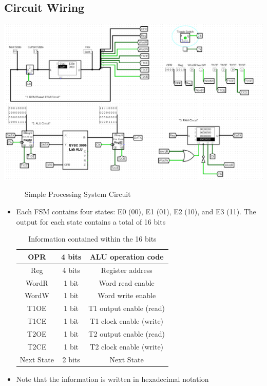 \documentclass{article}
\begin{document}
	\subsection{Circuit Wiring}
	\begin{center}
	\includegraphics[width=\linewidth]{simple_processing_system_circuit.png}
	\end{center}

	\begin{figure}[h]
		\centering
		\caption {Simple Processing System Circuit}
	\end{figure}	

	\begin{itemize}
		\item Each FSM contains four states: E0 (00), E1 (01), E2 (10), and E3 (11). The output for each state contains a total of 16 bits
		
		\begin{table}[h]
			\centering
			\caption{Information contained within the 16 bits}
			\vspace{0.2cm}
			\begin{tabular}{|c|c|c|}
				\hline
				OPR & 4 bits & ALU operation code\\
				\hline
				Reg & 4 bits & Register address\\
				\hline
				WordR & 1 bit & Word read enable\\
				\hline
				WordW & 1 bit & Word write enable\\
				\hline
				T1OE & 1 bit & T1 output enable (read)\\
				\hline
				T1CE & 1 bit & T1 clock enable (write)\\
				\hline
				T2OE & 1 bit & T2 output enable (read)\\
				\hline
				T2CE & 1 bit & T2 clock enable (write)\\
				\hline
				Next State & 2 bits & Next State\\
				\hline				
			\end{tabular}
		\end{table}
	
	\item Note that the information is written in hexadecimal notation
	\end{itemize}
\end{document}
